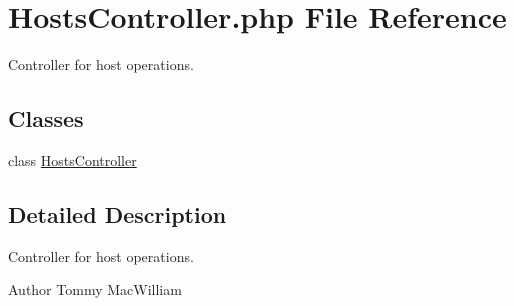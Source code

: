 \hypertarget{HostsController_8php}{
\section{\-Hosts\-Controller.php \-File \-Reference}
\label{HostsController_8php}
}


\-Controller for host operations.  


\subsection*{\-Classes}
\begin{DoxyCompactItemize}
\item 
class \hyperlink{classHostsController}{\-Hosts\-Controller}
\end{DoxyCompactItemize}


\subsection{\-Detailed \-Description}
\-Controller for host operations. \begin{DoxyAuthor}{\-Author}
\-Tommy \-Mac\-William 
\end{DoxyAuthor}
